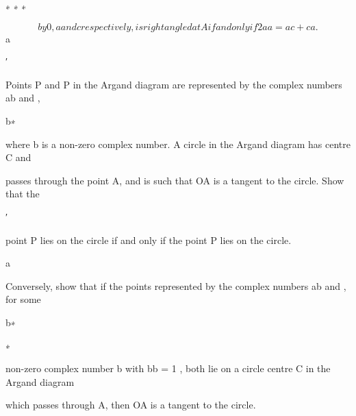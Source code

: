 \documentclass[12pt]{article}
\begin{document}
\begin{flushleft}
∗ ∗ ∗\par
\[by 0, a and c respectively, is right angled at A if and only if 2aa = ac + ca .\]
a\par
′\par
Points P and P in the Argand diagram are represented by the complex numbers ab and ,\par
b∗\par
where b is a non-zero complex number. A circle in the Argand diagram has centre C and\par
passes through the point A, and is such that OA is a tangent to the circle. Show that the\par
′\par
point P lies on the circle if and only if the point P lies on the circle.\par
a\par
Conversely, show that if the points represented by the complex numbers ab and , for some\par
b∗\par
∗\par
non-zero complex number b with bb = 1 , both lie on a circle centre C in the Argand diagram\par
which passes through A, then OA is a tangent to the circle.\par
\end{flushleft}
\end{document}
